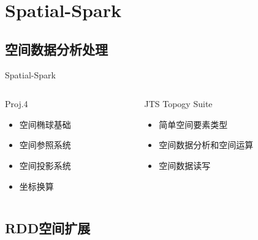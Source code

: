 \section{Spatial-Spark}

\subsection{空间数据分析处理}

\begin{frame}[t]{Spatial-Spark}
    \begin{columns}
        \begin{column}{0.4 \textwidth}

            \begin{center}
            \alert{Proj.4}

            \begin{itemize}
                \item 空间椭球基础
                \item 空间参照系统
                \item 空间投影系统
                \item 坐标换算
            \end{itemize}
            \end{center}
            
        \end{column}
        \pause
        \begin{column}{0.6 \textwidth}

            \begin{center}
             \alert{JTS Topogy Suite}

                \begin{itemize}
                \item 简单空间要素类型
                \item 空间数据分析和空间运算
                \item 空间数据读写
                \end{itemize}
            \end{center}
           
        \end{column}
    \end{columns}
\end{frame}

\subsection{RDD空间扩展}

